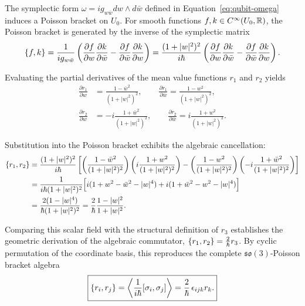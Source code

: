 \noindent The symplectic form $\omega = i g_{w\bar{w}} dw \wedge d\bar{w}$ defined in Equation~\eqref{eq:qubit-omega} induces a Poisson bracket on $U_0$. For smooth functions $f, k \in C^\infty(U_0, \mathbb{R})$, the Poisson bracket is generated by the inverse of the symplectic matrix
\begin{equation}
	\{f,k\} = \frac{1}{i g_{w\bar{w}}} \left( \frac{\partial f}{\partial w} \frac{\partial k}{\partial \bar{w}} - \frac{\partial f}{\partial \bar{w}} \frac{\partial k}{\partial w} \right) = \frac{(1+|w|^2)^2}{i\hbar} \left( \frac{\partial f}{\partial w} \frac{\partial k}{\partial \bar{w}} - \frac{\partial f}{\partial \bar{w}} \frac{\partial k}{\partial w} \right).
\end{equation}

\noindent Evaluating the partial derivatives of the mean value functions $r_1$ and $r_2$ yields
\begin{align}
	\frac{\partial r_1}{\partial w} &= \frac{1 - \bar{w}^2}{(1+|w|^2)^2}, \qquad \frac{\partial r_1}{\partial \bar{w}} = \frac{1 - w^2}{(1+|w|^2)^2}, \\
	\frac{\partial r_2}{\partial w} &= -i\frac{1 + \bar{w}^2}{(1+|w|^2)^2}, \qquad \frac{\partial r_2}{\partial \bar{w}} = i\frac{1 + w^2}{(1+|w|^2)^2}.
\end{align}

\noindent Substitution into the Poisson bracket exhibits the algebraic cancellation:
\begin{align}
	\{r_1,r_2\} &= \frac{(1+|w|^2)^2}{i\hbar} \left[ \left(\frac{1 - \bar{w}^2}{(1+|w|^2)^2}\right) \left(i\frac{1 + w^2}{(1+|w|^2)^2}\right) - \left(\frac{1 - w^2}{(1+|w|^2)^2}\right) \left(-i\frac{1 + \bar{w}^2}{(1+|w|^2)^2}\right) \right] \nonumber \\
	&= \frac{1}{i\hbar(1+|w|^2)^2} \Big[ i(1 + w^2 - \bar{w}^2 - |w|^4) + i(1 + \bar{w}^2 - w^2 - |w|^4) \Big] \nonumber \\
	&= \frac{2(1 - |w|^4)}{\hbar(1+|w|^2)^2} = \frac{2}{\hbar} \frac{1 - |w|^2}{1+|w|^2}.
\end{align}

\noindent Comparing this scalar field with the structural definition of $r_3$ establishes the geometric derivation of the algebraic commutator, $\{r_1,r_2\} = \frac{2}{\hbar} r_3$. By cyclic permutation of the coordinate basis, this reproduces the complete $\mathfrak{so}(3)$-Poisson bracket algebra
\begin{equation}
	\boxed{\{r_i,r_j\}=\left\langle\dfrac{1}{i\hbar}[\sigma_i,\sigma_j]\right\rangle=\frac2\hbar\,\epsilon_{ijk}r_k.} \label{eq:qubit-poisson}
\end{equation}

